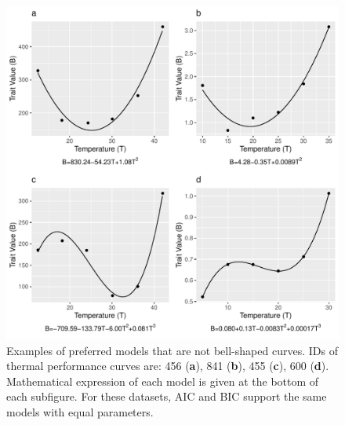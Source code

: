 \documentclass[11pt]{article}
\begin{document}
    \begin{figure}[H]
      \centering
      \includegraphics[width=\textwidth]{../Results/Fig2.pdf}
      \caption{Examples of preferred models that are not bell-shaped curves. IDs of thermal performance curves 
      are: 456 (\textbf{a}), 
      841 (\textbf{b}), 455 (\textbf{c}), 600 (\textbf{d}). Mathematical expression of each model is given at 
      the bottom of each subfigure. For these datasets, AIC and BIC support the same models with equal parameters.} 
    \end{figure}
\end{document}
